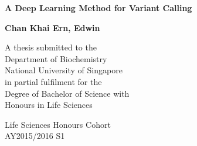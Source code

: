 \documentclass{article}
\begin{document}
\begin{titlepage}


    \begin{center} 
	\Large
        \vspace*{1cm}
        
        \textbf{A Deep Learning Method for Variant Calling}
        
        \vspace{0.5cm}
        
        \vspace{1.0cm}
        
        \textbf{Chan Khai Ern, Edwin}
        
\vspace{9.0cm}
        \normalsize
       A thesis submitted to the \\
Department of Biochemistry \\
National University of Singapore \\
in partial fulfilment for the \\
Degree of Bachelor of Science with \\Honours
in
Life Sciences\\

        
        \vspace{1.5cm}
        
        
        Life Sciences Honours Cohort \\
        AY2015/2016 S1\\
       
        
    \end{center}
\end{titlepage}


\doublespace
\normalsize
\end{document}
